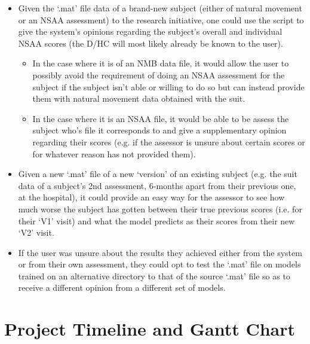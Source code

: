 \documentclass[12pt,twoside]{report}
\begin{document}
\begin{itemize}
	\item Given the ‘.mat’ file data of a brand-new subject (either of natural movement or an NSAA assessment) to the research initiative, one could use the script to give the system’s opinions regarding the subject’s overall and individual NSAA scores (the D/HC will most likely already be known to the user).
	\begin{itemize}
		\item In the case where it is of an NMB data file, it would allow the user to possibly avoid the requirement of doing an NSAA assessment for the subject if the subject isn’t able or willing to do so but can instead provide them with natural movement data obtained with the suit.
		\item In the case where it is an NSAA file, it would be able to be assess the subject who’s file it corresponds to and give a supplementary opinion regarding their scores (e.g. if the assessor is unsure about certain scores or for whatever reason has not provided them).
	\end{itemize}
	\item Given a new ‘.mat’ file of a new ‘version’ of an existing subject (e.g. the suit data of a subject’s 2nd assessment, 6-months apart from their previous one, at the hospital), it could provide an easy way for the assessor to see how much worse the subject has gotten between their true previous scores (i.e. for their ‘V1’ visit) and what the model predicts as their scores from their new ‘V2’ visit.
	\item If the user was unsure about the results they achieved either from the system or from their own assessment, they could opt to test the ‘.mat’ file on models trained on an alternative directory to that of the source ‘.mat’ file so as to receive a different opinion from a different set of models.
\end{itemize}












\chapter{Project Timeline and Gantt Chart\\~\\}
\end{document}
